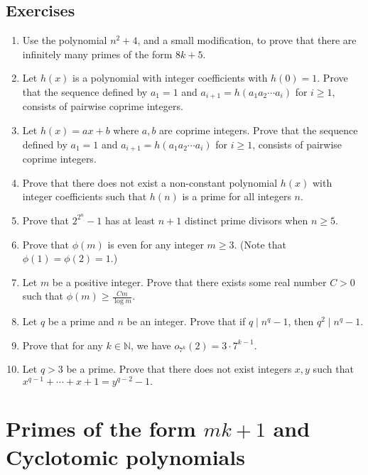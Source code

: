 \documentclass{article}
\def\N{{\mathbb N}}
\begin{document}
\subsection*{Exercises}
\begin{enumerate}[\thesection .1]
    \item Use the polynomial $n^2 + 4$, and a small modification, to prove that there are infinitely many primes of the form $8k + 5$.

    \item Let $h(x)$ is a polynomial with integer coefficients with $h(0) = 1$. Prove that the sequence defined by $a_1 = 1$ and $a_{i+1} = h(a_1a_2\cdots a_i)$ for $i\geq 1$, consists of pairwise coprime integers.

    \item Let $h(x) = ax + b$ where $a,b$ are coprime integers. Prove that the sequence defined by $a_1 = 1$ and $a_{i+1} = h(a_1a_2\cdots a_i)$ for $i\geq 1$, consists of pairwise coprime integers.

    \item Prove that there does not exist a non-constant polynomial $h(x)$ with integer coefficients such that $h(n)$ is a prime for all integers $n$.

    \item Prove that $2^{2^n}-1$ has at least $n+1$ distinct prime divisors when $n\geq 5$.

    \item Prove that $\phi(m)$ is even for any integer $m\geq 3$. (Note that $\phi(1) = \phi(2) = 1$.)

    \item Let $m$ be a positive integer. Prove that there exists some real number $C>0$ such that $\displaystyle\phi(m) \geq \frac{Cm}{\log m}.$

    \item Let $q$ be a prime and $n$ be an integer. Prove that if $q\mid n^q - 1$, then $q^2\mid n^q - 1$.

    \item Prove that for any $k\in\N$, we have $o_{7^k}(2) = 3\cdot7^{k-1}$.

    \item Let $q > 3$ be a prime. Prove that there does not exist integers $x,y$ such that $x^{q-1} + \cdots + x + 1 = y^{q-2} - 1.$
\end{enumerate}

\section{Primes of the form $mk+1$ and Cyclotomic polynomials}
\end{document}
